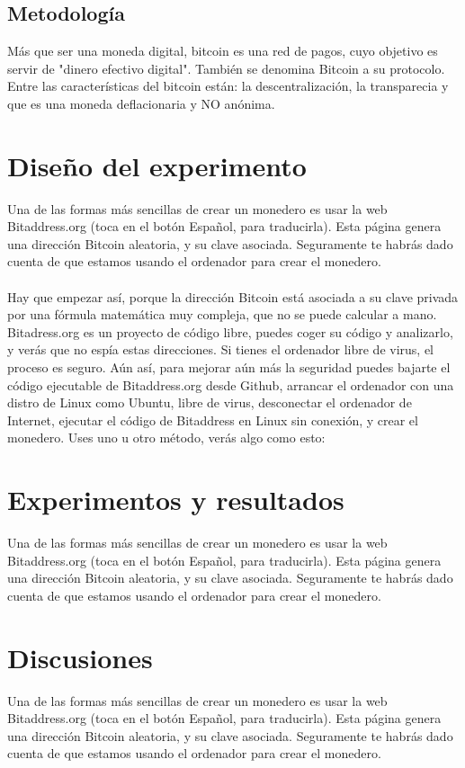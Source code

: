 \documentclass[10pt,twocolumn]{article}
\theoremstyle{definition}
\begin{document}
\subsection{Metodología}
Más que ser una moneda digital, bitcoin es una red de pagos, cuyo objetivo es servir de "dinero efectivo digital". También se denomina Bitcoin a su protocolo. Entre las características del bitcoin están: la descentralización, la transparecia y que es una moneda deflacionaria y NO anónima.


\section{Diseño del experimento}
Una de las formas más sencillas de crear un monedero es usar la web Bitaddress.org (toca en el botón Español, para traducirla). Esta página genera una dirección Bitcoin aleatoria, y su clave asociada. Seguramente te habrás dado cuenta de que estamos usando el ordenador para crear el monedero. 
\\ \\
Hay que empezar así, porque la dirección Bitcoin está asociada a su clave privada por una fórmula matemática muy compleja, que no se puede calcular a mano. Bitadress.org es un proyecto de código libre, puedes coger su código y analizarlo, y verás que no espía estas direcciones. Si tienes el ordenador libre de virus, el proceso es seguro. Aún así, para mejorar aún más la seguridad puedes bajarte el código ejecutable de Bitaddress.org desde Github, arrancar el ordenador con una distro de Linux como Ubuntu, libre de virus, desconectar el ordenador de Internet, ejecutar el código de Bitaddress en Linux sin conexión, y crear el monedero. Uses uno u otro método, verás algo como esto:

\section{Experimentos y resultados}
Una de las formas más sencillas de crear un monedero es usar la web Bitaddress.org (toca en el botón Español, para traducirla). Esta página genera una dirección Bitcoin aleatoria, y su clave asociada. Seguramente te habrás dado cuenta de que estamos usando el ordenador para crear el monedero. 

\section{Discusiones}
Una de las formas más sencillas de crear un monedero es usar la web Bitaddress.org (toca en el botón Español, para traducirla). Esta página genera una dirección Bitcoin aleatoria, y su clave asociada. Seguramente te habrás dado cuenta de que estamos usando el ordenador para crear el monedero. 
\end{document}
